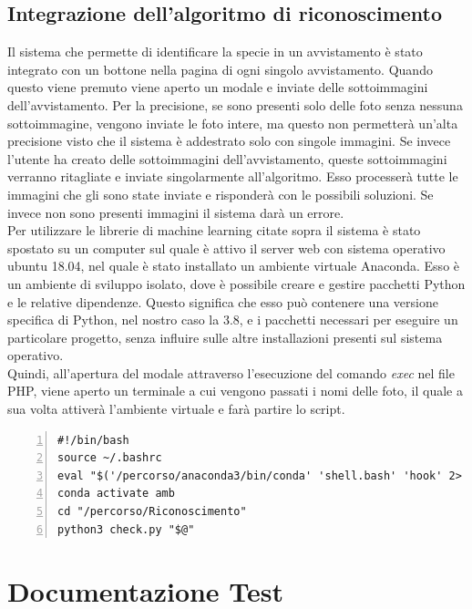 \documentclass[a4paper,final,12pt]{report}
\begin{document}
\section{Integrazione dell'algoritmo di riconoscimento}
Il sistema che permette di identificare la specie in un avvistamento è stato integrato con un bottone nella pagina di ogni singolo avvistamento. Quando questo viene premuto viene aperto un modale e inviate delle sottoimmagini dell'avvistamento. Per la precisione, se sono presenti solo delle foto senza nessuna sottoimmagine, vengono inviate le foto intere, ma questo non permetterà un'alta precisione visto che il sistema è addestrato solo con singole immagini. Se invece l'utente ha creato delle sottoimmagini dell'avvistamento, queste sottoimmagini verranno ritagliate e inviate singolarmente all'algoritmo. Esso processerà tutte le immagini che gli sono state inviate e risponderà con le possibili soluzioni. Se invece non sono presenti immagini il sistema darà un errore.\\
Per utilizzare le librerie di machine learning citate sopra il sistema è stato spostato su un computer sul quale è attivo il server web con sistema operativo ubuntu 18.04, nel quale è stato installato un ambiente virtuale Anaconda. Esso è un ambiente di sviluppo isolato, dove è possibile creare e gestire pacchetti Python e le relative dipendenze. Questo significa che esso può contenere una versione specifica di Python, nel nostro caso la 3.8, e i pacchetti necessari per eseguire un particolare progetto, senza influire sulle altre installazioni presenti sul sistema operativo.\\
Quindi, all'apertura del modale attraverso l'esecuzione del comando \textit{exec} nel file PHP, viene aperto un terminale a cui vengono passati i nomi delle foto, il quale a sua volta attiverà l'ambiente virtuale e farà partire lo script.
\begin{lstlisting}[caption={Codice script bash.}, label={lst:script_bash}, breaklines, escapechar=`\%, frame=lines, basicstyle=\small\ttfamily, keepspaces=true, numbers=left]
#!/bin/bash
source ~/.bashrc
eval "$('/percorso/anaconda3/bin/conda' 'shell.bash' 'hook' 2> /dev/null)"
conda activate amb
cd "/percorso/Riconoscimento"
python3 check.py "$@"
\end{lstlisting}

\chapter{Documentazione Test}
\end{document}
